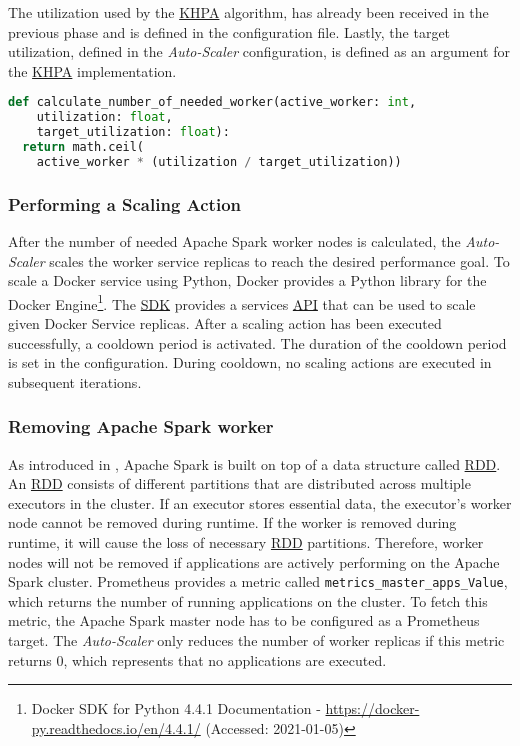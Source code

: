 The utilization used by the \hyperlink{abbr:khpa}{KHPA} algorithm, has already been received in the previous phase and is defined in the configuration file. Lastly, the target utilization, defined in the \textit{Auto-Scaler} configuration, is defined as an argument for the  \hyperlink{abbr:khpa}{KHPA} implementation. 
\begin{lstlisting}[label=lst:06_auto-scaler_plan_khpa, caption=KHPA implementation using Python 3.8, language=Python]
def calculate_number_of_needed_worker(active_worker: int,
    utilization: float,
    target_utilization: float):
  return math.ceil(
    active_worker * (utilization / target_utilization))
\end{lstlisting}


\subsubsection{Performing a Scaling Action}
After the number of needed Apache Spark worker nodes is calculated, the \textit{Auto-Scaler} scales the worker service replicas to reach the desired performance goal.
To scale a Docker service using Python, Docker provides a Python library for the Docker Engine\footnote{Docker SDK for Python 4.4.1 Documentation - \url{https://docker-py.readthedocs.io/en/4.4.1/} (Accessed: 2021-01-05)}. 
The \hyperlink{abbr:sdk}{SDK} provides a services \hyperlink{abbr:api}{API} that can be used to scale given Docker Service replicas.
After a scaling action has been executed successfully, a cooldown period is activated. The duration of the cooldown period is set in the configuration. During cooldown, no scaling actions are executed in subsequent iterations.


\subsubsection{Removing Apache Spark worker}
As introduced in , Apache Spark is built on top of a data structure called \hyperlink{abbr:rdd}{RDD}. An \hyperlink{abbr:rdd}{RDD} consists of different partitions that are distributed across multiple executors in the cluster.
If an executor stores essential data, the executor's worker node cannot be removed during runtime. If the worker is removed during runtime, it will cause the loss of necessary \hyperlink{abbr:rdd}{RDD} partitions.
Therefore, worker nodes will not be removed if applications are actively performing on the Apache Spark cluster.
Prometheus provides a metric called \texttt{metrics\_master\_apps\_Value}, which returns the number of running applications on the cluster. To fetch this metric, the Apache Spark master node has to be configured as a Prometheus target.
The \textit{Auto-Scaler} only reduces the number of worker replicas if this metric returns 0, which represents that no applications are executed.


